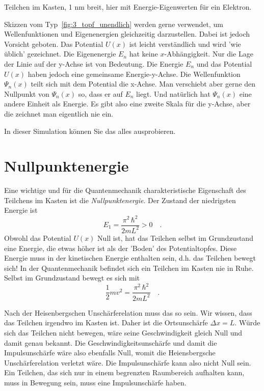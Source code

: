 \begin{marginfigure}
    \caption{Teilchen im Kasten, 1 nm breit, hier mit Energie-Eigenwerten für ein Elektron.}
    \label{fig:3_topf_unendlich}
\end{marginfigure}

Skizzen vom Typ~\ref{fig:3_topf_unendlich} werden gerne verwendet, um Wellenfunktionen und Eigenenergien gleichzeitig darzustellen. Dabei ist jedoch Vorsicht geboten. Das Potential $U(x)$ ist leicht verständlich und wird 'wie üblich' gezeichnet. Die Eigenenergie $E_n$ hat keine $x$-Abhängigkeit. Nur die Lage der Linie auf der y-Achse ist von Bedeutung. Die Energie $E_n$ und das Potential $U(x)$ haben jedoch eine gemeinsame Energie-y-Achse. Die Wellenfunktion $\Psi_n(x)$ teilt sich mit dem Potential die x-Achse. Man verschiebt aber gerne den Nullpunkt von $\Psi_n(x)$ so, dass er auf $E_n$ liegt. Und natürlich hat $\Psi_n(x)$ eine andere Einheit als Energie. Es gibt also eine zweite Skala für die y-Achse, aber die zeichnet man eigentlich nie ein.


\begin{questions}
    \item In dieser Simulation können Sie das alles ausprobieren. 
\end{questions}

\section{Nullpunktenergie}

Eine wichtige und für die Quantenmechanik charakteristische Eigenschaft des Teilchens im Kasten ist die \emph{Nullpunktenergie}. Der Zustand der niedrigsten Energie ist 
\begin{equation}
    E_1 = \frac{\pi^2 \, \hbar^2}{2 m L^2} > 0 \quad .
\end{equation}
Obwohl das Potential $U(x)$ Null ist, hat das Teilchen selbst im Grundzustand eine Energie, die etwas höher ist als der 'Boden' des Potentialtopfes. Diese Energie muss in der kinetischen Energie enthalten sein, d.h. das Teilchen bewegt sich! In der Quantenmechanik befindet sich ein Teilchen im Kasten nie in Ruhe. Selbst im Grundzustand bewegt es sich mit 
\begin{equation}
    \frac{1}{2} m v^2 = \frac{\pi^2 \, \hbar^2}{2 m L^2}  \quad .
\end{equation}

Nach der Heisenbergschen Unschärferelation muss das so sein. Wir wissen, dass das Teilchen irgendwo im Kasten ist. Daher ist die Ortsunschärfe $\Delta x = L$. Würde sich das Teilchen nicht bewegen, wäre seine Geschwindigkeit gleich Null und damit genau bekannt. Die Geschwindigkeitsunschärfe und damit die Impulsunschärfe wäre also ebenfalls Null, womit die Heiensbergsche Unschärferelation verletzt wäre. 
Die Impulsunschärfe kann also nicht Null sein. Ein Teilchen, das sich nur in einem begrenzten Raumbereich aufhalten kann, muss in Bewegung sein, muss eine Impulsunschärfe haben.



